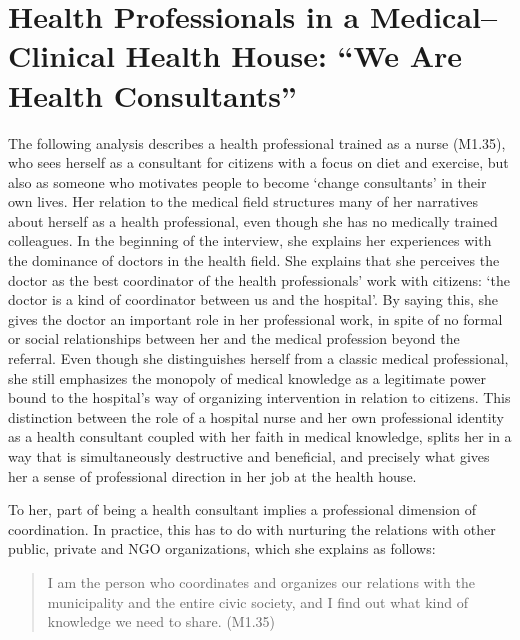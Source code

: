 \section{Health Professionals in a Medical--Clinical Health House: “We Are Health Consultants”}
The following analysis describes a health professional trained as a nurse (M1.35), who sees herself as a consultant for citizens with a focus on diet and exercise, but also as someone who motivates people to become ‘change consultants’ in their own lives. Her relation to the medical field structures many of her narratives about herself as a health professional, even though she has no medically trained colleagues. In the beginning of the interview, she explains her experiences with the dominance of doctors in the health field. She explains that she perceives the doctor as the best coordinator of the health professionals’ work with citizens: ‘the doctor is a kind of coordinator between us and the hospital’. By saying this, she gives the doctor an important role in her professional work, in spite of no formal or social relationships between her and the medical profession beyond the referral. Even though she distinguishes herself from a classic medical professional, she still emphasizes the monopoly of medical knowledge as a legitimate power bound to the hospital’s way of organizing intervention in relation to citizens. This distinction between the role of a hospital nurse and her own professional identity as a health consultant coupled with her faith in medical knowledge, splits her in a way that is simultaneously destructive and beneficial, and precisely what gives her a sense of professional direction in her job at the health house.
\par
To her, part of being a health consultant implies a professional dimension of coordination. In practice, this has to do with nurturing the relations with other public, private and NGO organizations, which she explains as follows:
    \blockquote{I am the person who coordinates and organizes our relations with the municipality and the entire civic society, and I find out what kind of knowledge we need to share. (M1.35)}
\par
